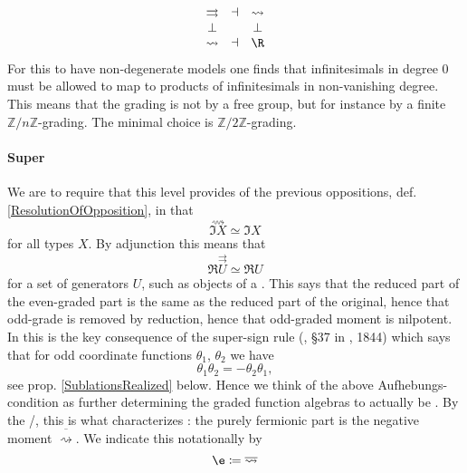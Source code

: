 \documentclass[12pt,titlepage]{article}
\newcommand{\itexarray}[1]{\begin{matrix}#1\end{matrix}}
\theoremstyle{plain}
\theoremstyle{definition}
\theoremstyle{remark}
\begin{document}
\begin{displaymath}
\itexarray{
\rightrightarrows &\dashv& \rightsquigarrow
\\
\bot && \bot
\\
\rightsquigarrow &\dashv& \R
}
\end{displaymath}
For this to have non-degenerate models one finds that infinitesimals in degree 0 must be allowed to map to products of infinitesimals in non-vanishing degree. This means that the grading is not by a free group, but for instance by a finite  $\mathbb{Z}/n\mathbb{Z}$-grading. The minimal choice is $\mathbb{Z}/2\mathbb{Z}$-grading.
\hypertarget{FormalizationSuperGrading}{}\paragraph*{{Super}}\label{FormalizationSuperGrading}
We are to require that this level provides  of the previous oppositions, def. \ref{ResolutionOfOpposition}, in that
\begin{displaymath}
\stackrel{\rightsquigarrow}{\Im X} \simeq \Im X
\end{displaymath}
for all types $X$. By adjunction this means that
\begin{displaymath}
\Re \stackrel{\rightrightarrows}{U} \simeq \Re U
\end{displaymath}
for a set of generators $U$, such as objects of a .
This says that the reduced part of the even-graded part is the same as the reduced part of the original, hence that odd-grade is removed by reduction, hence that odd-graded moment is nilpotent. In  this is the key consequence of the super-sign rule (, §37 in , 1844) which says that for odd coordinate functions $\theta_1$, $\theta_2$ we have
\begin{displaymath}
\theta_1 \theta_2 = -\theta_2 \theta_1
,
\end{displaymath}
see prop. \ref{SublationsRealized} below.
Hence we think of the above Aufhebungs-condition as further determining the graded function algebras to actually be .
By the /, this is what characterizes : the purely fermionic part is the negative moment $\overline{\rightsquigarrow}$.
We indicate this notationally by
\begin{displaymath}
\e \coloneqq \overline{\rightsquigarrow}
\end{displaymath}
\end{document}
